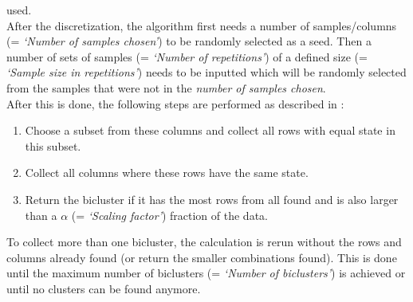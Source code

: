 \documentclass[a4paper]{article}\usepackage[]{graphicx}\usepackage[]{color}
\begin{document}
used.\\
After the discretization, the algorithm first needs a number of
samples/columns (= {\it `Number of samples chosen'}) to be randomly selected as
a seed. Then a number of sets of samples (= {\it `Number of repetitions'}) of
a defined size (= {\it `Sample size in repetitions'}) needs to be inputted which
will be randomly selected from the samples that were not in the {\it number of
samples chosen}.\\
After this is done, the following steps are performed as described in
\citet{Kaiser2008}:
\begin{enumerate}
  \item Choose a subset from these columns and collect all rows with equal state
  in this subset.
  \item Collect all columns where these rows have the same state.
  \item Return the bicluster if it has the most rows from all found and is also
  larger than a $\alpha$ (= {\it `Scaling factor'}) fraction of the data.
\end{enumerate}
\noindent To collect more than one bicluster, the calculation is rerun without
the rows and columns already found (or return the smaller combinations found). This
is done until the maximum number of biclusters (= {\it `Number of biclusters'})
is achieved or until no clusters can be found anymore.
\end{document}
